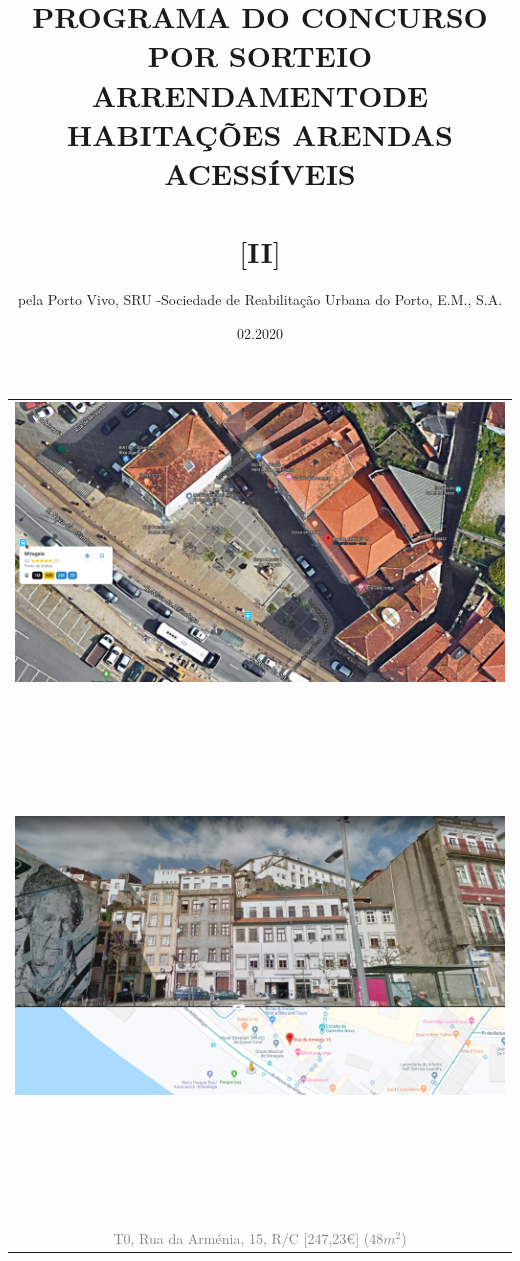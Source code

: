 \documentclass[]{report}
\title{PROGRAMA DO CONCURSO POR SORTEIO \\ ARRENDAMENTODE HABITAÇÕES ARENDAS ACESSÍVEIS \\ ~\\ $[$II$]$ \\}
\author{pela Porto Vivo, SRU -Sociedade de Reabilitação Urbana do Porto, E.M., S.A.}
\date{02.2020}
\begin{document}
\maketitle





\begin{table}[]
	\begin{center}
	\begin{huge}
	\begin{tabular}{c}
		\includegraphics[width=1\textwidth]{rua_da_armenia_n_15_rc_sat} \\
		~\\
		~\\
		~\\
		~\\
		~\\
		\includegraphics[width=1\textwidth]{rua_da_armenia_n_15_rc_str} \\
		~\\
		~\\
		~\\
		~\\
		~\\
		\textcolor{gray}{T0, Rua da Arm\'{e}nia, 15, R/C [247,23€] (48$m^{2}$)}
	\end{tabular}
	\end{huge}
	\end{center}
\end{table}
\end{document}
